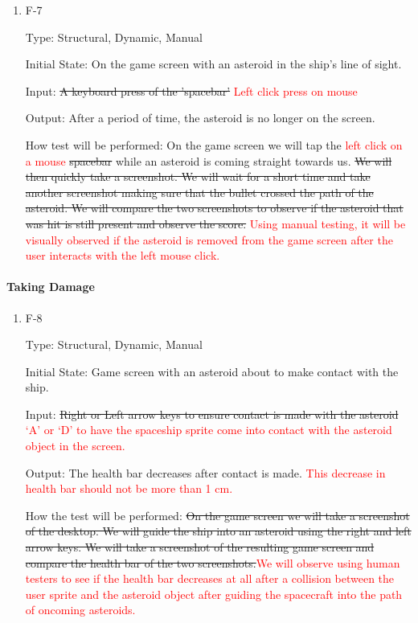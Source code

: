 \documentclass[12pt, titlepage]{article}
\begin{document}
\begin{enumerate}
\item{F-7\\}

Type: Structural, Dynamic, Manual

Initial State: On the game screen with an asteroid in the ship's line of sight.

Input: \sout{A keyboard press of the 'spacebar'} \textcolor{red}{Left click press on mouse}

Output: After a period of time, the asteroid is no longer on the screen.

How test will be performed: On the game screen we will tap the  \textcolor{red}{left click on a mouse} \sout{spacebar} while an asteroid is coming straight towards us. \sout{We will then quickly take a screenshot. We will wait for a short time and take another screenshot making sure that the bullet crossed the path of the asteroid. We will compare the two screenshots to observe if the asteroid that was hit is still present and observe the score.}  \textcolor{red}{Using manual testing, it will be visually observed if the asteroid is removed from the game screen after the user interacts with the left mouse click.}

\end{enumerate}

\paragraph{Taking Damage}

\begin{enumerate}

\item{F-8\\}

Type: Structural, Dynamic, Manual

Initial State: Game screen with an asteroid about to make contact with the ship.

Input: \sout{Right or Left arrow keys to ensure contact is made with the asteroid} \textcolor{red}{`A' or `D' to have the spaceship sprite come into contact with the asteroid object in the screen.}

Output: The health bar decreases after contact is made. \textcolor{red}{This decrease in health bar should not be more than 1 cm.}

How the test will be performed: \sout{On the game screen we will take a screenshot of the desktop. We will guide the ship into an asteroid using the right and left arrow keys. We will take a screenshot of the resulting game screen and compare the health bar of the two screenshots.}\textcolor{red}{We will observe using human testers to see if the health bar decreases at all after a collision between the user sprite and the asteroid object after guiding the spacecraft into the path of oncoming asteroids.}

\end{enumerate}
\end{document}
